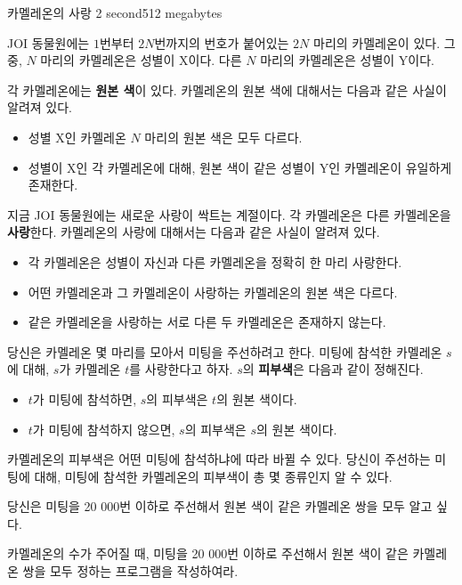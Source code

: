 \begin{problem}{카멜레온의 사랑}
	{}{}
	{2 second}{512 megabytes}{}
	
	JOI 동물원에는 $1$번부터 $2N$번까지의 번호가 붙어있는 $2N$ 마리의 카멜레온이 있다. 그 중, $N$ 마리의 카멜레온은 성별이 X이다. 다른 $N$ 마리의 카멜레온은 성별이 Y이다.
	
	각 카멜레온에는 \textbf{원본 색}이 있다. 카멜레온의 원본 색에 대해서는 다음과 같은 사실이 알려져 있다.
	
	\begin{itemize}
		\item 성별 X인 카멜레온 $N$ 마리의 원본 색은 모두 다르다.
		\item 성별이 X인 각 카멜레온에 대해, 원본 색이 같은 성별이 Y인 카멜레온이 유일하게 존재한다.
	\end{itemize}
	
	지금 JOI 동물원에는 새로운 사랑이 싹트는 계절이다. 각 카멜레온은 다른 카멜레온을 \textbf{사랑}한다. 카멜레온의 사랑에 대해서는 다음과 같은 사실이 알려져 있다.
	
	\begin{itemize}
		\item 각 카멜레온은 성별이 자신과 다른 카멜레온을 정확히 한 마리 사랑한다.
		\item 어떤 카멜레온과 그 카멜레온이 사랑하는 카멜레온의 원본 색은 다르다.
		\item 같은 카멜레온을 사랑하는 서로 다른 두 카멜레온은 존재하지 않는다.
	\end{itemize}

	당신은 카멜레온 몇 마리를 모아서 미팅을 주선하려고 한다. 미팅에 참석한 카멜레온 $s$에 대해, $s$가 카멜레온 $t$를 사랑한다고 하자. $s$의 \textbf{피부색}은 다음과 같이 정해진다.
	
	\begin{itemize}
		\item $t$가 미팅에 참석하면, $s$의 피부색은 $t$의 원본 색이다.
		\item $t$가 미팅에 참석하지 않으면, $s$의 피부색은 $s$의 원본 색이다.
	\end{itemize}

	카멜레온의 피부색은 어떤 미팅에 참석하냐에 따라 바뀔 수 있다. 당신이 주선하는 미팅에 대해, 미팅에 참석한 카멜레온의 피부색이 총 몇 종류인지 알 수 있다.
	
	당신은 미팅을 20 000번 이하로 주선해서 원본 색이 같은 카멜레온 쌍을 모두 알고 싶다.
	
	카멜레온의 수가 주어질 때, 미팅을 20 000번 이하로 주선해서 원본 색이 같은 카멜레온 쌍을 모두 정하는 프로그램을 작성하여라.
	

\end{problem}

